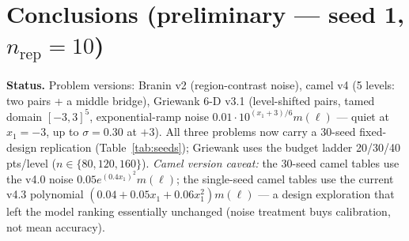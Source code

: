\section*{Conclusions (preliminary --- seed 1, $n_{\mathrm{rep}}=10$)}

\textbf{Status.} Problem versions: Branin v2 (region-contrast noise), camel v4
(5 levels: two pairs + a middle bridge), Griewank 6-D v3.1 (level-shifted pairs, tamed domain
$[-3,3]^5$, exponential-ramp noise $0.01\cdot10^{(x_1+3)/6}m(\ell)$ --- quiet at $x_1=-3$, up
to $\sigma=0.30$ at $+3$). All three problems now carry a 30-seed fixed-design replication
(Table~\ref{tab:seeds}); Griewank uses the budget ladder 20/30/40 pts/level
($n\in\{80,120,160\}$). \emph{Camel version caveat:} the 30-seed camel tables use the v4.0
noise $0.05e^{(0.4x_1)^2}m(\ell)$; the single-seed camel tables use the current v4.3
polynomial $(0.04+0.05x_1+0.06x_1^2)m(\ell)$ --- a design exploration that left the model
ranking essentially unchanged (noise treatment buys calibration, not mean accuracy).

